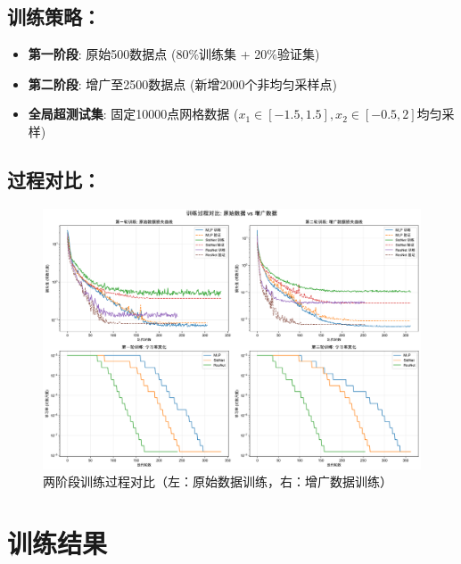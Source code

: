 \documentclass[11pt]{article}
\begin{document}
\subsection{训练策略：}
\begin{itemize}[leftmargin=2em]
    \item \textbf{第一阶段}: 原始500数据点 (80\%训练集 + 20\%验证集)
    \item \textbf{第二阶段}: 增广至2500数据点 (新增2000个非均匀采样点)
    \item \textbf{全局超测试集}: 固定10000点网格数据 ($x_1\in[-1.5,1.5], x_2\in[-0.5,2]$均匀采样)
\end{itemize}

\subsection{过程对比：}
\begin{figure}[H]
    \centering
    \includegraphics[width=0.9\linewidth]{results_20250330_150206/figures/训练过程对比.png}
    \caption{两阶段训练过程对比（左：原始数据训练，右：增广数据训练）}
    \label{fig:training_process}
\end{figure}

\section{训练结果}
\end{document}
